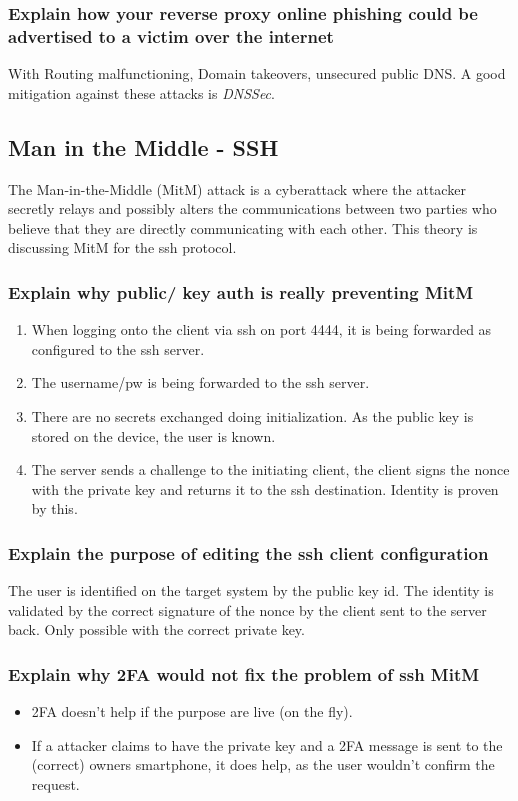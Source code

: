 \subsubsection{Explain how your reverse proxy online phishing could be advertised to a victim over the internet}
With Routing malfunctioning, Domain takeovers, unsecured public DNS. A good mitigation against these attacks is \textit{DNSSec}.

\subsection{Man in the Middle - SSH}
The Man-in-the-Middle (MitM) attack is a cyberattack where the attacker secretly relays and possibly alters the communications between two parties who believe that they are directly communicating with each other. This theory is discussing MitM for the ssh protocol.

\subsubsection{Explain why public/ key auth is really preventing MitM}

\begin{enumerate}
    \item When logging onto the client via ssh on port 4444, it is being forwarded as configured to the ssh server.
    \item The username/pw is being forwarded to the ssh server.
    \item There are no secrets exchanged doing initialization. As the public key is stored on the device, the user is \glqq known\grqq.
    \item The server sends a challenge to the initiating client, the client signs the nonce with the private key and returns it
    to the ssh destination. Identity is proven by this.
\end{enumerate}

\subsubsection{Explain the purpose of editing the ssh client configuration}
The user is identified on the target system by the public key id. The identity is validated by the correct signature of the nonce by the client sent to the server back. Only possible with the correct private key.

\subsubsection{Explain why 2FA would not fix the problem of ssh MitM}
\begin{itemize}
    \item 2FA doesn't help if the purpose are live (on the fly).
    \item If a attacker claims to have the private key and a 2FA message is sent to the (correct) owners smartphone, it does help, as the user wouldn't confirm the request.
\end{itemize}

